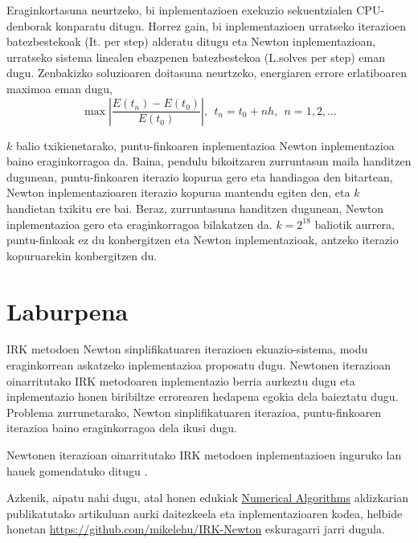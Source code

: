 Eraginkortasuna neurtzeko, bi inplementazioen exekuzio sekuentzialen CPU-denborak  konparatu ditugu. Horrez gain, bi inplementazioen urratseko iterazioen batezbestekoak (It. per step) alderatu ditugu eta Newton inplementazioan, urratseko sistema linealen ebazpenen batezbestekoa (L.solves per step) eman dugu. Zenbakizko soluzioaren doitasuna neurtzeko, energiaren errore erlatiboaren maximoa eman dugu,
\begin{equation*}
\max | \frac{E(t_n)-E(t_0)}{E(t_0)}|, \ \  t_n=t_0+nh, \ \ n=1,2,\dots
\end{equation*} 

$k$ balio txikienetarako, puntu-finkoaren inplementazioa Newton inplementazioa baino eraginkorragoa da. Baina, pendulu bikoitzaren zurruntasun maila handitzen dugunean, puntu-finkoaren iterazio kopurua gero eta handiagoa den bitartean, Newton inplementazioaren iterazio kopurua mantendu egiten den, eta $k$ handietan txikitu ere bai. Beraz, zurruntasuna handitzen dugunean, Newton inplementazioa gero eta eraginkorragoa bilakatzen da. $k=2^{18}$ baliotik aurrera, puntu-finkoak ez du konbergitzen eta Newton inplementazioak, antzeko iterazio kopuruarekin konbergitzen du.

 



\section{Laburpena}

IRK metodoen Newton sinplifikatuaren iterazioen ekuazio-sistema, modu eraginkorrean askatzeko inplementazioa proposatu dugu. Newtonen iterazioan oinarritutako IRK metodoaren inplementazio berria aurkeztu dugu eta inplementazio honen biribiltze errorearen hedapena egokia dela baieztatu dugu. Problema zurrunetarako, Newton sinplifikatuaren iterazioa, puntu-finkoaren iterazioa baino eraginkorragoa dela ikusi dugu.

Newtonen iterazioan oinarritutako IRK metodoen inplementazioen inguruko lan hauek \cite{Butcher1976,Hairer2006} gomendatuko ditugu .

Azkenik, aipatu nahi dugu, atal honen edukiak \href{http://link.springer.com/journal/11075}{Numerical Algorithms} aldizkarian publikatutako \cite{Antonana2017a} artikuluan aurki daitezkeela eta inplementazioaren kodea, helbide honetan   \url{https://github.com/mikelehu/IRK-Newton} eskuragarri jarri dugula.
